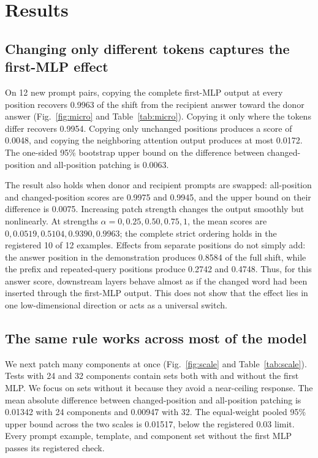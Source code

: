 \documentclass[pdflatex,sn-nature]{sn-jnl}
\begin{document}
\section{Results}\label{sec:results}

\subsection{Changing only different tokens captures the first-MLP effect}\label{sec:micro}

On 12 new prompt pairs, copying the complete first-MLP output at every position
recovers 0.9963 of the shift from the recipient answer toward the donor answer
(Fig.~\ref{fig:micro} and Table~\ref{tab:micro}). Copying it only where the
tokens differ recovers 0.9954. Copying only unchanged positions produces a
score of 0.0048, and copying the neighboring attention output produces at most
0.0172. The one-sided 95\% bootstrap upper bound on the difference between
changed-position and all-position patching is 0.0063.

The result also holds when donor and recipient prompts are swapped:
all-position and changed-position scores are 0.9975 and 0.9945, and the upper
bound on their difference is 0.0075. Increasing patch strength changes the
output smoothly but nonlinearly. At strengths
$\alpha=0,0.25,0.50,0.75,1$, the mean scores are
$0,0.0519,0.5104,0.9390,0.9963$; the complete strict ordering holds in the
registered 10 of 12 examples. Effects from separate positions do not simply
add: the answer position in the demonstration produces 0.8584 of the full
shift, while the prefix and repeated-query positions produce 0.2742 and
0.4748. Thus, for this answer score, downstream layers behave almost as if the
changed word had been inserted through the first-MLP output. This does not
show that the effect lies in one low-dimensional direction or acts as a
universal switch.

\subsection{The same rule works across most of the model}\label{sec:scale}

We next patch many components at once (Fig.~\ref{fig:scale} and
Table~\ref{tab:scale}). Tests with 24 and 32 components contain sets both with
and without the first MLP. We focus on sets without it because they avoid a
near-ceiling response. The mean absolute difference between changed-position
and all-position patching is 0.01342 with 24 components and 0.00947 with 32.
The equal-weight pooled 95\% upper bound across the two scales is 0.01517,
below the registered 0.03 limit.
Every prompt example, template, and component set without the first MLP passes
its registered check.
\end{document}
